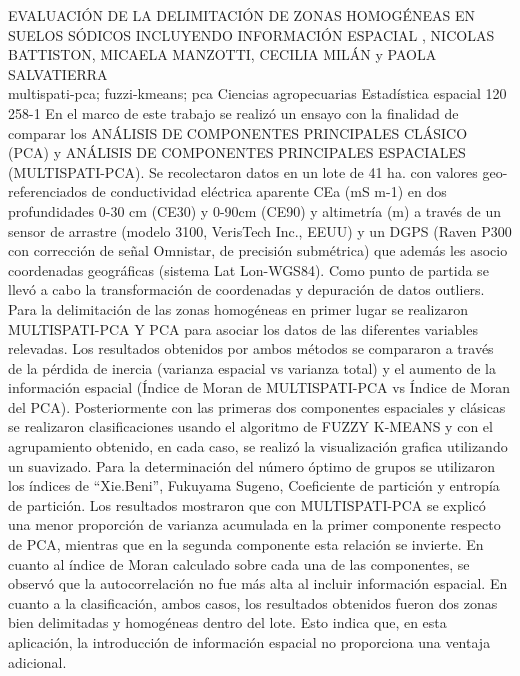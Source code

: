 \A
{EVALUACIÓN DE LA DELIMITACIÓN DE ZONAS HOMOGÉNEAS EN SUELOS SÓDICOS INCLUYENDO INFORMACIÓN ESPACIAL}
{, NICOLAS BATTISTON, MICAELA MANZOTTI, CECILIA MILÁN y PAOLA SALVATIERRA}
{
\\}
{multispati-pca; fuzzi-kmeans; pca} 
 {Ciencias agropecuarias} 
 {Estadística espacial} 
 {120} 
 {258-1}
{En el marco de este trabajo se realizó un ensayo con la finalidad de comparar los ANÁLISIS DE COMPONENTES PRINCIPALES CLÁSICO (PCA) y ANÁLISIS DE COMPONENTES PRINCIPALES ESPACIALES (MULTISPATI-PCA). Se recolectaron datos en un lote de 41 ha. con valores geo-referenciados de conductividad eléctrica aparente CEa (mS m-1) en dos profundidades 0-30 cm (CE30) y 0-90cm (CE90) y altimetría (m) a través de un sensor de arrastre (modelo 3100, VerisTech Inc., EEUU) y un DGPS (Raven P300 con corrección de señal Omnistar, de precisión submétrica) que además les asocio coordenadas geográficas (sistema Lat Lon-WGS84). Como punto de partida se llevó a cabo la transformación de coordenadas y depuración de datos outliers. Para la delimitación de las zonas homogéneas en primer lugar se realizaron MULTISPATI-PCA Y PCA para asociar los datos de las diferentes variables relevadas. Los resultados obtenidos por ambos métodos se compararon a través de la pérdida de inercia (varianza espacial vs varianza total) y el aumento de la información espacial (Índice de Moran de MULTISPATI-PCA vs Índice de Moran del PCA). Posteriormente con las primeras dos componentes espaciales y clásicas se realizaron clasificaciones usando el algoritmo de FUZZY K-MEANS y con el agrupamiento obtenido, en cada caso, se realizó la visualización grafica utilizando un suavizado. Para la determinación del número óptimo de grupos se utilizaron los índices de “Xie.Beni”, Fukuyama Sugeno, Coeficiente de partición y entropía de partición. Los resultados mostraron que con MULTISPATI-PCA se explicó una menor proporción de varianza acumulada en la primer componente respecto de PCA, mientras que en la segunda componente esta relación se invierte. En cuanto al índice de Moran calculado sobre cada una de las componentes, se observó que la autocorrelación no fue más alta al incluir información espacial. En cuanto a la clasificación, ambos casos, los resultados obtenidos fueron dos zonas bien delimitadas y homogéneas dentro del lote. Esto indica que, en esta aplicación, la introducción de información espacial no proporciona una ventaja adicional.}

